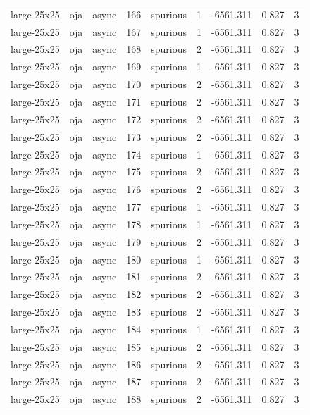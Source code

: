 \begin{tabular}{lllrlrrrr}
large-25x25 & oja & async & 166 & spurious & 1 & -6561.311 & 0.827 & 3 \\
large-25x25 & oja & async & 167 & spurious & 1 & -6561.311 & 0.827 & 3 \\
large-25x25 & oja & async & 168 & spurious & 2 & -6561.311 & 0.827 & 3 \\
large-25x25 & oja & async & 169 & spurious & 1 & -6561.311 & 0.827 & 3 \\
large-25x25 & oja & async & 170 & spurious & 2 & -6561.311 & 0.827 & 3 \\
large-25x25 & oja & async & 171 & spurious & 2 & -6561.311 & 0.827 & 3 \\
large-25x25 & oja & async & 172 & spurious & 2 & -6561.311 & 0.827 & 3 \\
large-25x25 & oja & async & 173 & spurious & 2 & -6561.311 & 0.827 & 3 \\
large-25x25 & oja & async & 174 & spurious & 1 & -6561.311 & 0.827 & 3 \\
large-25x25 & oja & async & 175 & spurious & 2 & -6561.311 & 0.827 & 3 \\
large-25x25 & oja & async & 176 & spurious & 2 & -6561.311 & 0.827 & 3 \\
large-25x25 & oja & async & 177 & spurious & 1 & -6561.311 & 0.827 & 3 \\
large-25x25 & oja & async & 178 & spurious & 1 & -6561.311 & 0.827 & 3 \\
large-25x25 & oja & async & 179 & spurious & 2 & -6561.311 & 0.827 & 3 \\
large-25x25 & oja & async & 180 & spurious & 1 & -6561.311 & 0.827 & 3 \\
large-25x25 & oja & async & 181 & spurious & 2 & -6561.311 & 0.827 & 3 \\
large-25x25 & oja & async & 182 & spurious & 2 & -6561.311 & 0.827 & 3 \\
large-25x25 & oja & async & 183 & spurious & 2 & -6561.311 & 0.827 & 3 \\
large-25x25 & oja & async & 184 & spurious & 1 & -6561.311 & 0.827 & 3 \\
large-25x25 & oja & async & 185 & spurious & 2 & -6561.311 & 0.827 & 3 \\
large-25x25 & oja & async & 186 & spurious & 2 & -6561.311 & 0.827 & 3 \\
large-25x25 & oja & async & 187 & spurious & 2 & -6561.311 & 0.827 & 3 \\
large-25x25 & oja & async & 188 & spurious & 2 & -6561.311 & 0.827 & 3 \\

\end{tabular}
